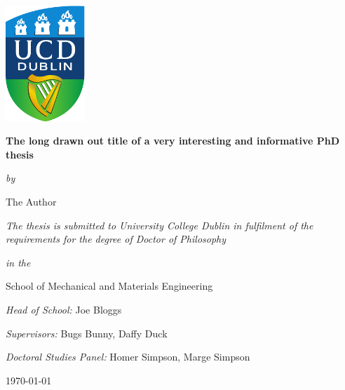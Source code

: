 
\begin{titlepage}
\begin{center}

\vspace*{0.5cm}		
\href{http://www.ucd.ie}{\includegraphics[width=3cm]{frontmatter/ucd_brandmark_colour.pdf}}

\vspace{1.5cm}		
\LARGE
\textbf{The long drawn out title of a very interesting and informative PhD thesis}

\large
\textit{by}

The Author %

\vspace{1.5cm}
\large
\textit{The thesis is submitted to University College Dublin in fulfilment of the requirements for the degree of Doctor of Philosophy}

\textit{in the}

School of Mechanical and Materials Engineering

\vspace{1.5cm}
\emph{Head of School:}
Joe Bloggs
 		
\emph{Supervisors:}
Bugs Bunny, Daffy Duck

\emph{Doctoral Studies Panel:}
Homer Simpson, Marge Simpson

\vspace{1.5cm}  
\large \today
		
\end{center}
\end{titlepage}